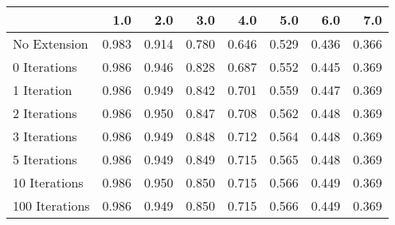 \begin{tabular}{lrrrrrrr}
\toprule
{} &   1.0 &   2.0 &   3.0 &   4.0 &   5.0 &   6.0 &   7.0 \\
\midrule
No Extension   & 0.983 & 0.914 & 0.780 & 0.646 & 0.529 & 0.436 & 0.366 \\
0 Iterations   & 0.986 & 0.946 & 0.828 & 0.687 & 0.552 & 0.445 & 0.369 \\
1 Iteration    & 0.986 & 0.949 & 0.842 & 0.701 & 0.559 & 0.447 & 0.369 \\
2 Iterations   & 0.986 & 0.950 & 0.847 & 0.708 & 0.562 & 0.448 & 0.369 \\
3 Iterations   & 0.986 & 0.949 & 0.848 & 0.712 & 0.564 & 0.448 & 0.369 \\
5 Iterations   & 0.986 & 0.949 & 0.849 & 0.715 & 0.565 & 0.448 & 0.369 \\
10 Iterations  & 0.986 & 0.950 & 0.850 & 0.715 & 0.566 & 0.449 & 0.369 \\
100 Iterations & 0.986 & 0.949 & 0.850 & 0.715 & 0.566 & 0.449 & 0.369 \\
\bottomrule
\end{tabular}
